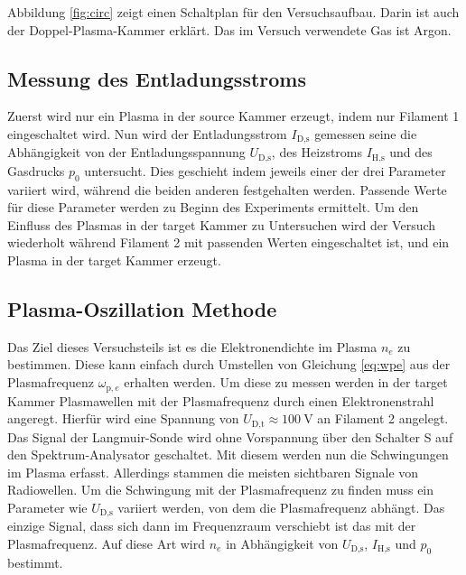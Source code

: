 Abbildung \vref{fig:circ} zeigt einen Schaltplan f\"ur den Versuchsaufbau.
Darin ist auch der Doppel-Plasma-Kammer erkl\"art.
Das im Versuch verwendete Gas ist Argon.

\subsection{Messung des Entladungsstroms}
Zuerst wird nur ein Plasma in der source Kammer erzeugt, indem nur Filament 1 eingeschaltet wird.
Nun wird der Entladungsstrom $I_\text{D,s}$ gemessen seine die Abh\"angigkeit von der Entladungsspannung $U_\text{D,s}$, des Heizstroms $I_\text{H,s}$ und des Gasdrucks $p_0$ untersucht.
Dies geschieht indem jeweils einer der drei Parameter variiert wird, w\"ahrend die beiden anderen festgehalten werden.
Passende Werte f\"ur diese Parameter werden zu Beginn des Experiments ermittelt.
Um den Einfluss des Plasmas in der target Kammer zu Untersuchen wird der Versuch wiederholt w\"ahrend Filament 2 mit passenden Werten eingeschaltet ist, und ein Plasma in der target Kammer erzeugt.

\subsection{Plasma-Oszillation Methode}
Das Ziel dieses Versuchsteils ist es die Elektronendichte im Plasma $n_e$ zu bestimmen.
Diese kann einfach durch Umstellen von Gleichung \eqref{eq:wpe} aus der Plasmafrequenz $\omega_{\text{p},e}$ erhalten werden.
Um diese zu messen werden in der target Kammer Plasmawellen mit der Plasmafrequenz durch einen Elektronenstrahl angeregt.
Hierf\"ur wird eine Spannung von $U_\text{D,t}\approx\SI{100}{\volt}$ an Filament 2 angelegt.
Das Signal der Langmuir-Sonde wird ohne Vorspannung \"uber den Schalter S auf den Spektrum-Analysator geschaltet.
Mit diesem werden nun die Schwingungen im Plasma erfasst.
Allerdings stammen die meisten sichtbaren Signale von Radiowellen.
Um die Schwingung mit der Plasmafrequenz zu finden muss ein Parameter wie $U_\text{D,s}$ variiert werden, von dem die Plasmafrequenz abh\"angt.
Das einzige Signal, dass sich dann im Frequenzraum verschiebt ist das mit der Plasmafrequenz.
Auf diese Art wird $n_e$ in Abh\"angigkeit von $U_\text{D,s}$, $I_\text{H,s}$ und $p_0$ bestimmt.

